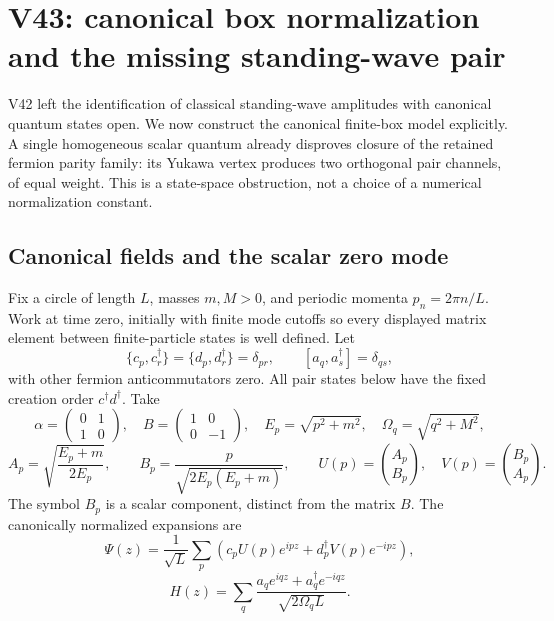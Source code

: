 \documentclass[11pt]{article}
\theoremstyle{remark}
\begin{document}
\section{V43: canonical box normalization and the missing standing-wave pair}
\label{sec:v20v43}

V42 left the identification of classical standing-wave amplitudes with
canonical quantum states open.  We now construct the canonical finite-box
model explicitly.  A single homogeneous scalar quantum already disproves
closure of the retained fermion parity family: its Yukawa vertex produces
two orthogonal pair channels, of equal weight.  This is a state-space
obstruction, not a choice of a numerical normalization constant.

\subsection{Canonical fields and the scalar zero mode}

Fix a circle of length \(L\), masses \(m,M>0\), and periodic momenta
\(p_n=2\pi n/L\).  Work at time zero, initially with finite mode cutoffs
so every displayed matrix element between finite-particle states is
well defined.  Let
\[
 \{c_p,c_r^\dagger\}=\{d_p,d_r^\dagger\}=\delta_{pr},
 \qquad [a_q,a_s^\dagger]=\delta_{qs},
\]
with other fermion anticommutators zero.  All pair states below have the
fixed creation order \(c^\dagger d^\dagger\).  Take
\[
 \alpha=\begin{pmatrix}0&1\\1&0\end{pmatrix},\quad
 B=\begin{pmatrix}1&0\\0&-1\end{pmatrix},\quad
 E_p=\sqrt{p^2+m^2},\quad \Omega_q=\sqrt{q^2+M^2},
\]
\[
 A_p=\sqrt{\frac{E_p+m}{2E_p}},\qquad
 B_p=\frac{p}{\sqrt{2E_p(E_p+m)}},\qquad
 U(p)=\binom{A_p}{B_p},\quad V(p)=\binom{B_p}{A_p}.
\]
The symbol \(B_p\) is a scalar component, distinct from the matrix \(B\).
The canonically normalized expansions are
\[
 \Psi(z)=\frac1{\sqrt L}\sum_p
 \left(c_pU(p)e^{ipz}+d_p^\dagger V(p)e^{-ipz}\right),
\]
\[
 H(z)=\sum_q\frac{a_qe^{iqz}+a_q^\dagger e^{-iqz}}
 {\sqrt{2\Omega_q L}}.
\]
\end{document}
